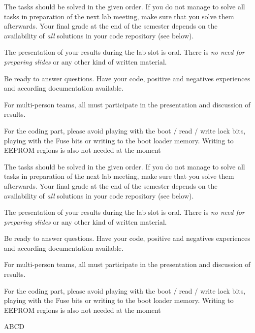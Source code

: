 \documentclass[11pt,globalcounting,tutor,solution,exam]{tutorial}
\begin{document}
\begin{homework}{5}
The tasks should be solved in the given order. If you do not manage to solve all tasks in preparation of the next lab meeting, make sure that you solve them afterwards. Your final grade at the end of the semester depends on the availability of \emph{all} solutions in your code repository (see below).

The presentation of your results during the lab slot is oral. There is \emph{no need for preparing slides} or any other kind of written material.

Be ready to answer questions. Have your code, positive and negatives experiences and according documentation available.

For multi-person teams, all must participate in the presentation and discussion of results.

For the coding part, please avoid playing with the boot / read / write lock bits, playing with the Fuse bits or writing to the boot loader memory. Writing to EEPROM regions is also not needed at the moment

\begin{subhomework}{5}
The tasks should be solved in the given order. If you do not manage to solve all tasks in preparation of the next lab meeting, make sure that you solve them afterwards. Your final grade at the end of the semester depends on the availability of \emph{all} solutions in your code repository (see below).

The presentation of your results during the lab slot is oral. There is \emph{no need for preparing slides} or any other kind of written material.

Be ready to answer questions. Have your code, positive and negatives experiences and according documentation available.

For multi-person teams, all must participate in the presentation and discussion of results.

For the coding part, please avoid playing with the boot / read / write lock bits, playing with the Fuse bits or writing to the boot loader memory. Writing to EEPROM regions is also not needed at the moment
\end{subhomework}

\end{homework}
\begin{solution}[5cm]
ABCD
\end{solution}
\end{document}
